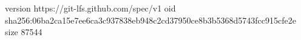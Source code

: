 version https://git-lfs.github.com/spec/v1
oid sha256:06ba2ca15e7ee6ca3c937838eb948c2cd37950ce8b3b5368d5743fcc915cfe2e
size 87544
